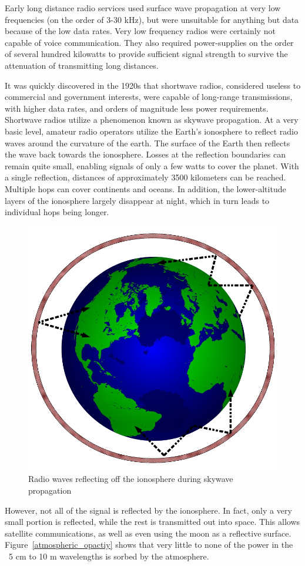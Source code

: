 \documentclass[letter,12pt]{article}
\begin{document}
		Early long distance radio services used surface wave propagation at very low frequencies (on the order of 3-30 kHz), but were unsuitable for anything but data because of the low data rates.  Very low frequency radios were certainly not capable of voice communication. They also required power-supplies on the order of several hundred kilowatts to provide sufficient signal strength to survive the attenuation of transmitting long distances.
		
		It was quickly discovered in the 1920s that shortwave radios, considered useless to commercial and government interests, were capable of long-range transmissions, with higher data rates, and orders of magnitude less power requirements. Shortwave radios utilize a phenomenon known as skywave propagation.  At a very basic level, amateur radio operators utilize the Earth's ionosphere to reflect radio waves around the curvature of the earth.  The surface of the Earth then reflects the wave back towards the ionosphere.  Losses at the reflection boundaries can remain quite small, enabling signals of only a few watts to cover the planet.  With a single reflection, distances of approximately 3500 kilometers can be reached. Multiple hops can cover continents and oceans. \cite{Rawer_93} In addition, the lower-altitude layers of the ionosphere largely disappear at night, which in turn leads to individual hops being longer. %
		
		\begin{figure}[h!]
			\centering
			\includegraphics[width=.5\textwidth]{./PNGs/skywave.png}
			\caption{Radio waves reflecting off the ionosphere during skywave propagation \cite{Wiki_Skywave}}
			\label{skywave}
		\end{figure}
		
		However, not all of the signal is reflected by the ionosphere.  In fact, only a very small portion is reflected, while the rest is transmitted out into space.  This allows satellite communications, as well as even using the moon as a reflective surface. Figure~\ref{atmospheric_opactiy} shows that very little to none of the power in the ~5 cm to 10 m wavelengths is sorbed by the atmosphere.
		
\end{document}
